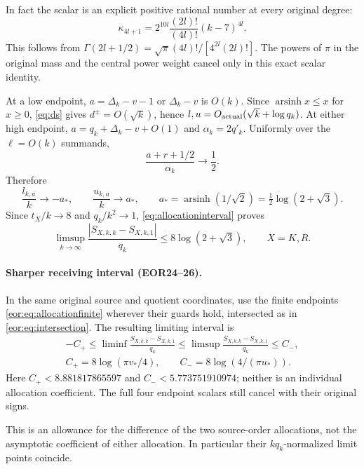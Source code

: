\documentclass[11pt,a4paper]{article}
\DeclareMathOperator{\arsinh}{arsinh}
\begin{document}
In fact the scalar is an explicit positive rational number at every original degree:
\begin{equation}
 \boxed{\qquad
 \kappa_{4l+1}=2^{10l}\frac{(2l)!}{(4l)!}(k-7)^{4l}.
 \qquad}\label{eq:kapparational}
\end{equation}
This follows from $\Gamma(2l+1/2)=\sqrt\pi(4l)!/[4^{2l}(2l)!]$.
The powers of $\pi$ in the original mass and the central power weight
cancel only in this exact scalar identity.


At a low endpoint, $a=\Delta_k-v-1$ or $\Delta_k-v$ is $O(k)$. Since $\arsinh x\le x$ for $x\ge0$, \eqref{eq:ds} gives $d^\pm=O(\sqrt k)$, hence $l,u=O_{\rm actual}(\sqrt k+\log q_k)$. At either high endpoint, $a=q_k+\Delta_k-v+O(1)$ and $\alpha_k=2q'_k$. Uniformly over the $\ell=O(k)$ summands,
\[
 \frac{a+r+1/2}{\alpha_k}\longrightarrow\frac12.
\]
Therefore
\begin{equation}
 \frac{l_{k,a}}k\longrightarrow-a_*,\qquad
 \frac{u_{k,a}}k\longrightarrow a_*,\qquad
 a_*=\arsinh(1/\sqrt2)=\tfrac12\log(2+\sqrt3).
 \label{eq:limits}
\end{equation}
Since $t_X/k\to8$ and $q_k/k^2\to1$, \eqref{eq:allocationinterval} proves
\begin{equation}
 \boxed{\quad
 \limsup_{k\to\infty}\frac{|S_{X,k,k}-S_{X,k,1}|}{q_k}
 \le 8\log(2+\sqrt3),\qquad X=K,R .\quad}
 \label{eq:allocationq}
\end{equation}
\paragraph{Sharper receiving interval (EOR24--26).}
In the same original source and quotient coordinates, use the finite endpoints
\eqref{eor:eq:allocationfinite} wherever their guards hold, intersected as in
\eqref{eor:eq:intersection}. The resulting limiting interval is
\[\begin{gathered}
 -C_+\le\liminf\frac{S_{X,k,k}-S_{X,k,1}}{q_k}
 \le\limsup\frac{S_{X,k,k}-S_{X,k,1}}{q_k}\le C_-,\\
 C_+=8\log(\pi v_*/4),\qquad C_-=8\log(4/(\pi u_*)).
\end{gathered}\]
Here $C_+<8.881817865597$ and $C_-<5.773751910974$; neither is an individual
allocation coefficient. The full four endpoint scalars still cancel with their
original signs.

This is an allowance for the difference of the two source-order allocations, not the asymptotic coefficient of either allocation. In particular their $kq_k$-normalized limit points coincide.
\end{document}
